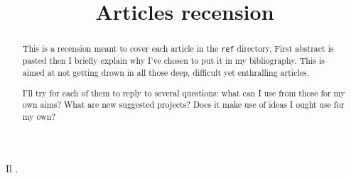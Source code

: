 \documentclass[12pt,onecolumn]{article} %
\title{Articles recension}
\author{}
\begin{document}
\maketitle
{}
\begin{abstract}
\par This is a recension meant to cover each article in the \texttt{ref} directory. First abstract is pasted then I briefly explain why I've chosen to put it in my bibliography. This is aimed at not getting drown in all those deep, difficult yet enthralling articles.\par I'll try for each of them to reply to several questions: what can I use from those for my own aims? What are new suggested projects? Does it make use of ideas I ought use for my own?
\end{abstract}
\tableofcontents

\section{}Il \cite{cook2003unihan}.
\section{}

\nocite{*}
\printbibliography[title={Bibliographie}, keyword={read}, heading=bibliography] %
\printbibheading[title={Références à traiter},heading=bibliography]
\printbibliography[title={A télécharger\footnote{Articles et documents auxquels je n'ai pas pu accéder.}}, keyword={wanted}, notkeyword={read}, heading=subbibliography]
\printbibliography[title={A lire\footnote{En d'autres termes : \textsc{taf}}}, notkeyword={wanted}, notkeyword={read}, heading=subbibliography]
\end{document}
